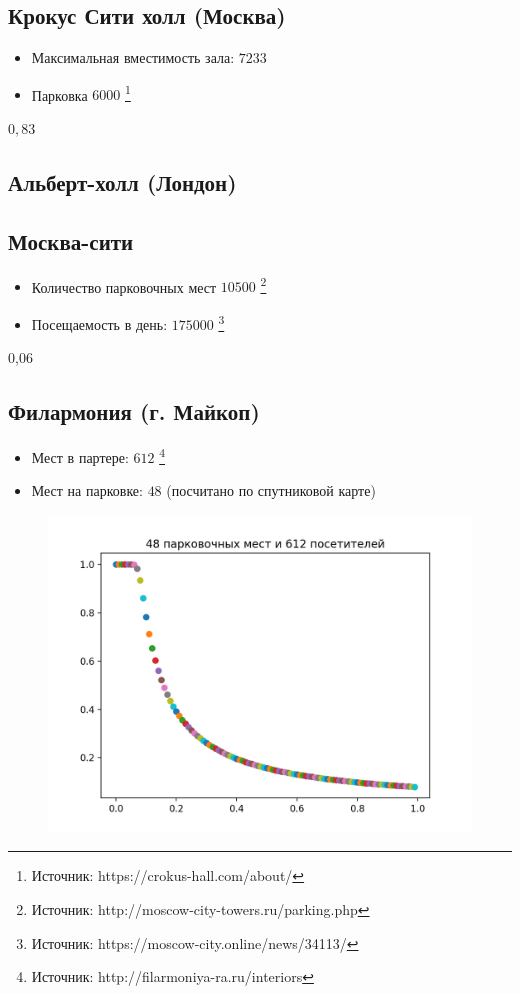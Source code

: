 \subsection{Крокус Сити холл (Москва)}
\begin{itemize}
	\item Максимальная вместимость зала: $7233$
	\item Парковка $6000$ \footnote{Источник: https://crokus-hall.com/about/}
\end{itemize}

$0,83$

\subsection{Альберт-холл (Лондон)}

\subsection{Москва-сити}
\begin{itemize}
	\item Количество парковочных мест $10 500$  \footnote{Источник: http://moscow-city-towers.ru/parking.php}
	\item Посещаемость в день:  $175 000$ \footnote{Источник: https://moscow-city.online/news/34113/}
\end{itemize}

0,06

\subsection{Филармония (г. Майкоп)}
\begin{itemize}
	\item Мест в партере: $612$ \footnote{Источник: http://filarmoniya-ra.ru/interiors}
	\item Мест на парковке: $48$ \small{(посчитано по спутниковой карте)}
\end{itemize}
\begin{figure}
	\includegraphics[scale=0.6]{img/612_48}	
\end{figure}

